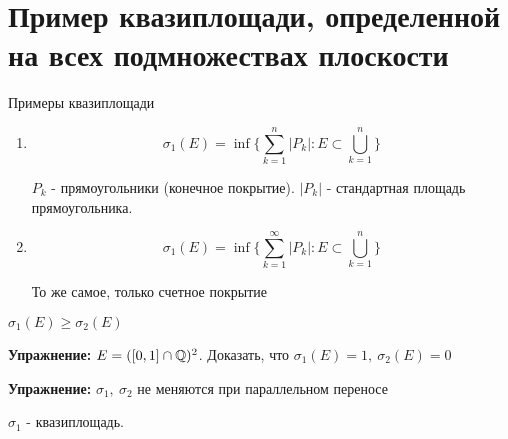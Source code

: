 \section{Пример квазиплощади, определенной на всех подмножествах плоскости \href{https://youtu.be/p9C57KDo1Yg?t=7344}{\Walley}}

Примеры квазиплощади

\begin{enumerate}
    \item \[\sigma_1(E) = \inf \bigg\{ \sum_{k=1}^{n}|P_k| : E \subset \bigcup\limits_{k=1}^n \bigg\} \]

$P_k$ - прямоугольники (конечное покрытие). $|P_k|$ - стандартная площадь прямоугольника.
    \item \[\sigma_1(E) = \inf \bigg\{ \sum_{k=1}^{\infty}|P_k| : E \subset \bigcup\limits_{k=1}^n \bigg\} \]

То же самое, только счетное покрытие
\end{enumerate}

\notice \; $\sigma_1(E) \geqslant \sigma_2(E)$

\textbf{Упражнение:} $E = ([0, 1] \cap \mathbb{Q})^2$. Доказать, что $\sigma_1(E) = 1,\ \sigma_2(E) = 0$

\textbf{Упражнение:} $\sigma_1,\ \sigma_2$ не меняются при параллельном переносе

\begin{theorem-non}
    $\sigma_1$ - квазиплощадь.
\end{theorem-non}

